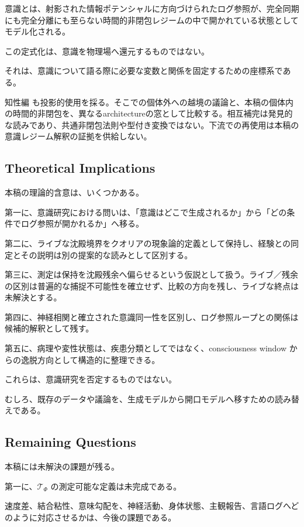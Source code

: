 意識とは、射影された情報ポテンシャルに方向づけられたログ参照が、完全同期にも完全分離にも至らない時間的非閉包レジームの中で開かれている状態としてモデル化される。

この定式化は、意識を物理場へ還元するものではない。

それは、意識について語る際に必要な変数と関係を固定するための座標系である。

知性編 \cite{Intelligence} も投影的使用を採る。そこでの個体外への越境の議論と、本稿の個体内の時間的非閉包を、異なるarchitectureの窓として比較する。相互補完は発見的な読みであり、共通非閉包法則や型付き変換ではない。下流での再使用は本稿の意識レジーム解釈の証拠を供給しない。

\subsection{Theoretical Implications}

本稿の理論的含意は、いくつかある。

第一に、意識研究における問いは、「意識はどこで生成されるか」から「どの条件でログ参照が開かれるか」へ移る。

第二に、ライブな沈殿境界をクオリアの現象論的定義として保持し、経験との同定とその説明は別の提案的な読みとして区別する。

第三に、測定は保持を沈殿残余へ偏らせるという仮説として扱う。ライブ／残余の区別は普遍的な捕捉不可能性を確立せず、比較の方向を残し、ライブな終点は未解決とする。

第四に、神経相関と確立された意識同一性を区別し、ログ参照ループとの関係は候補的解釈として残す。

第五に、病理や変性状態は、疾患分類としてではなく、consciousness window からの逸脱方向として構造的に整理できる。

これらは、意識研究を否定するものではない。

むしろ、既存のデータや議論を、生成モデルから開口モデルへ移すための読み替えである。

\subsection{Remaining Questions}

本稿には未解決の課題が残る。

第一に、$\mathcal{T}_{\Phi}$ の測定可能な定義は未完成である。

速度差、結合粘性、意味勾配を、神経活動、身体状態、主観報告、言語ログへどのように対応させるかは、今後の課題である。

